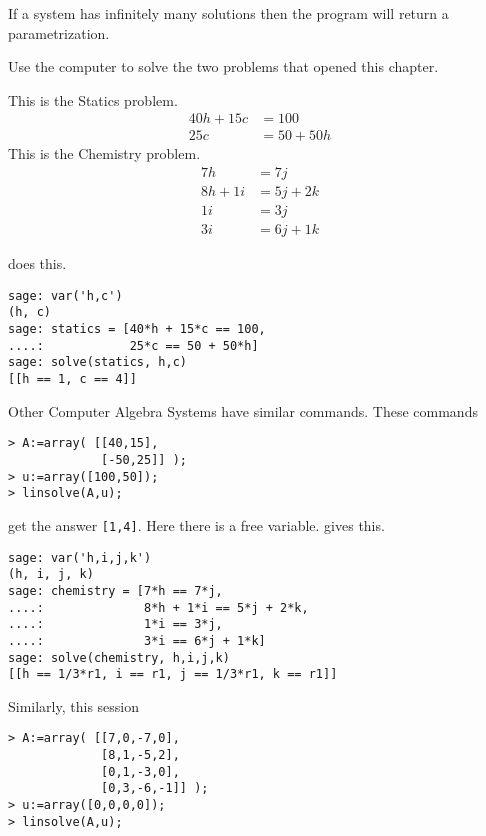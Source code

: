 If a system has infinitely many solutions then 
the program will return a parametrization.


\begin{exercises}
  \item 
    Use the computer to solve the two problems that opened this
    chapter.
    \begin{exparts}
      \partsitem This is the Statics problem.
         \begin{align*}
            40h+15c  &= 100  \\
            25c      &= 50+50h
         \end{align*}
      \partsitem This is the Chemistry problem.
         \begin{align*} 
             7h      &= 7j  \\
             8h +1i  &= 5j+2k  \\
             1i      &= 3j  \\
             3i      &= 6j+1k
         \end{align*}
    \end{exparts}
    \begin{answer}
      \begin{exparts}
        \partsitem 
\Sage{} does this.
\begin{lstlisting}
sage: var('h,c')
(h, c)
sage: statics = [40*h + 15*c == 100,
....:            25*c == 50 + 50*h]
sage: solve(statics, h,c)
[[h == 1, c == 4]] 
\end{lstlisting}
Other Computer Algebra Systems have similar commands.
These \Maple{} commands
\begin{lstlisting}
> A:=array( [[40,15],
             [-50,25]] );
> u:=array([100,50]);
> linsolve(A,u);
\end{lstlisting}
           get the answer \lstinline![1,4]!.
        \partsitem Here there is a free variable.
\Sage{} gives this.
\begin{lstlisting}
sage: var('h,i,j,k')
(h, i, j, k)
sage: chemistry = [7*h == 7*j,
....:              8*h + 1*i == 5*j + 2*k,
....:              1*i == 3*j,
....:              3*i == 6*j + 1*k]
sage: solve(chemistry, h,i,j,k)
[[h == 1/3*r1, i == r1, j == 1/3*r1, k == r1]]          
\end{lstlisting}
Similarly, this \Maple{} session 
\begin{lstlisting}
> A:=array( [[7,0,-7,0],
             [8,1,-5,2],
             [0,1,-3,0],
             [0,3,-6,-1]] );
> u:=array([0,0,0,0]);
> linsolve(A,u);
\end{lstlisting}

\end{exparts}
\end{answer}
\end{exercises}
